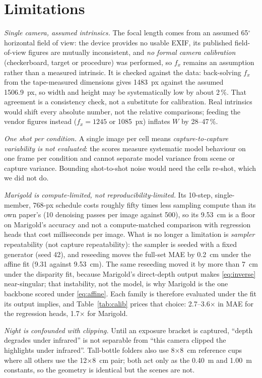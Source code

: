 \documentclass[conference]{IEEEtran}
\begin{document}
\section{Limitations}
\label{sec:limits}
\emph{Single camera, assumed intrinsics.} The focal length comes from an assumed
65$^\circ$ horizontal field of view: the device provides no usable EXIF, its
published field-of-view figures are mutually inconsistent, and \emph{no formal
camera calibration} (checkerboard, target or procedure) was performed, so $f_x$
remains an assumption rather than a measured intrinsic. It is checked against the
data: back-solving $f_x$ from the tape-measured dimensions gives 1483~px against
the assumed 1506.9~px, so width and height may be systematically low by about
2\,\%. That agreement is a consistency check, not a substitute for calibration.
Real intrinsics would shift every absolute number, not the relative comparisons;
feeding the vendor figures instead ($f_x=1245$ or 1085~px) inflates $W$ by
28--47\,\%.

\emph{One shot per condition.} A single image per cell means \emph{capture-to-capture
variability is not evaluated}: the scores measure systematic model behaviour on
one frame per condition and cannot separate model variance from scene or capture
variance. Bounding shot-to-shot noise would need the cells re-shot, which we did
not do.

\emph{Marigold is compute-limited, not reproducibility-limited.} Its 10-step,
single-member, 768-px schedule costs roughly fifty times less sampling compute
than its own paper's (10 denoising passes per image against 500), so its 9.53~cm
is a floor on Marigold's accuracy and not a compute-matched comparison with
regression heads that cost milliseconds per image. What is no longer a
limitation is \emph{sampler} repeatability (not capture repeatability): the
sampler is seeded with a fixed generator (seed
42), and reseeding moves the full-set MAE by 0.2~cm under the affine fit (9.31
against 9.53~cm). The same reseeding moved it by more than 7~cm under the
disparity fit, because Marigold's direct-depth output makes \eqref{eq:inverse}
near-singular; that instability, not the model, is why Marigold is the one
backbone scored under \eqref{eq:affine}. Each family is therefore evaluated under
the fit its output implies, and Table~\ref{tab:calib} prices that choice:
2.7--3.6$\times$ in MAE for the regression heads, 1.7$\times$ for Marigold.

\emph{Night is confounded with clipping.} Until an exposure bracket is captured,
``depth degrades under infrared'' is not separable from ``this camera clipped the
highlights under infrared''. Tall-bottle folders also use 8$\times$8~cm reference
cups where all others use the 12$\times$8~cm pair; both act only as the 0.40~m
and 1.00~m constants, so the geometry is identical but the scenes are not.
\end{document}
